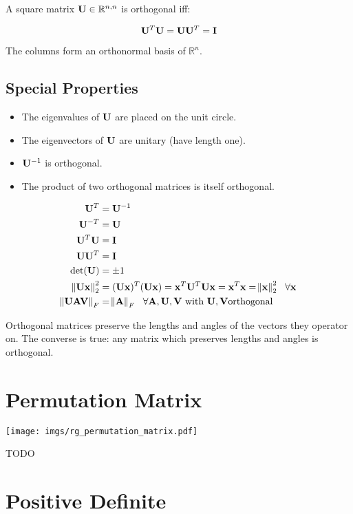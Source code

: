 A square matrix $\mathbf{U}\in\mathbb{R}^{n,n}$ is orthogonal iff:

\begin{equation}
\mathbf{U}^T \mathbf{U} = \mathbf{U} \mathbf{U}^T = \mathbf{I}
\end{equation}

The columns form an orthonormal basis of $\mathbb{R}^n$.



\subsection*{Special Properties}

\begin{itemize}
\item The eigenvalues of $\mathbf{U}$ are placed on the unit circle.
\item The eigenvectors of $\mathbf{U}$ are unitary (have length one).
\item $\mathbf{U}^{-1}$ is orthogonal.
\item The product of two orthogonal matrices is itself orthogonal.
\end{itemize}

\begin{align}
\mathbf{U}^T     &= \mathbf{U}^{-1} \\
\mathbf{U}^{-T}  &= \mathbf{U}      \\
\mathbf{U}^T\mathbf{U}  &= \mathbf{I}      \\
\mathbf{U}\mathbf{U}^T  &= \mathbf{I}      \\
\det(\mathbf{U}) &= \pm1     \\
\norm{\mathbf{U} \mathbf{x}}^2_2&=(\mathbf{U}\mathbf{x})^T(\mathbf{U}\mathbf{x})=\mathbf{x}^T\mathbf{U}^T\mathbf{U}\mathbf{x}=\mathbf{x}^T\mathbf{x}=\norm{\mathbf{x}}^2_2~~\forall \mathbf{x} \\
\norm{\mathbf{U} \mathbf{A} \mathbf{V}}_F&=\norm{\mathbf{A}}_F~~\forall \mathbf{A},\mathbf{U},\mathbf{V}~\textrm{with}~\mathbf{U},\mathbf{V} \textrm{orthogonal}
\end{align}

Orthogonal matrices preserve the lengths and angles of the vectors they operator on. The converse is true: any matrix which preserves lengths and angles is orthogonal.

\section{Permutation Matrix}
\begin{center}
\texttt{[image: imgs/rg\_permutation\_matrix.pdf]}
\end{center}

TODO



\section{Positive Definite}

